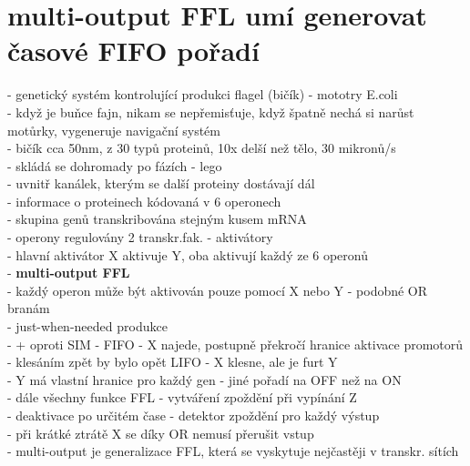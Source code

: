 \documentclass[11pt,a4paper]{report}
\begin{document}
\section{multi-output FFL umí generovat časové FIFO pořadí}
- genetický systém kontrolující produkci flagel (bičík) - mototry E.coli\\
- když je buňce fajn, nikam se nepřemisťuje, když špatně nechá si narůst motůrky, vygeneruje navigační systém\\
- bičík cca 50nm, z 30 typů proteinů, 10x delší než tělo, 30 mikronů/s\\
\indent - skládá se dohromady po fázích - lego\\
\indent \indent - uvnitř kanálek, kterým se další proteiny dostávají dál\\
\indent - informace o proteinech kódovaná v 6 operonech\\
\indent \indent - skupina genů transkribována stejným kusem mRNA\\
\indent \indent - operony regulovány 2 transkr.fak. - aktivátory\\
\indent \indent \indent - hlavní aktivátor X aktivuje Y, oba aktivují každý ze 6 operonů\\
\indent \indent \indent \indent - \textbf{multi-output FFL}\\
\indent \indent \indent - každý operon může být aktivován pouze pomocí X nebo Y - podobné OR branám\\
\indent \indent \indent - just-when-needed produkce\\
\indent \indent \indent - + oproti SIM - FIFO - X najede, postupně překročí hranice aktivace promotorů\\
\indent \indent \indent \indent - klesáním zpět by bylo opět LIFO - X klesne, ale je furt Y\\
\indent \indent \indent \indent - Y má vlastní hranice pro každý gen - jiné pořadí na OFF než na ON\\
\indent \indent \indent - dále všechny funkce FFL - vytváření zpoždění při vypínání Z \\
\indent \indent \indent \indent - deaktivace po určitém čase - detektor zpoždění pro každý výstup\\
\indent \indent \indent - při krátké ztrátě X se díky OR nemusí přerušit vstup\\
\indent \indent \indent - multi-output je generalizace FFL, která se vyskytuje nejčastěji v transkr. sítích\\
\end{document}
